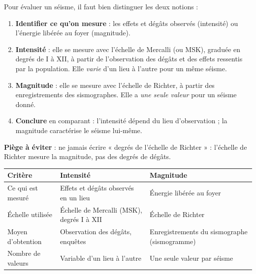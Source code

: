 \documentclass[11pt]{article}
\newcommand{\cle}[1]{{\popxbold\color{popdark}#1}}
\begin{document}
\begin{methode}
Pour évaluer un séisme, il faut bien distinguer les deux notions :
\begin{enumerate}
\item \textbf{Identifier ce qu'on mesure} : les effets et dégâts observés (intensité) ou l'énergie libérée au foyer (magnitude).
\item \textbf{Intensité} : elle se mesure avec l'\cle{échelle de Mercalli} (ou MSK), graduée en degrés de I à XII, à partir de l'observation des dégâts et des effets ressentis par la population. Elle \emph{varie} d'un lieu à l'autre pour un même séisme.
\item \textbf{Magnitude} : elle se mesure avec l'\cle{échelle de Richter}, à partir des enregistrements des sismographes. Elle a \emph{une seule valeur} pour un séisme donné.
\item \textbf{Conclure} en comparant : l'intensité dépend du lieu d'observation ; la magnitude caractérise le séisme lui-même.
\end{enumerate}
\textbf{Piège à éviter} : ne jamais écrire « degrés de l'échelle de Richter » : l'échelle de Richter mesure la magnitude, pas des degrés de dégâts.
\end{methode}

\begin{aretenir}
\begin{center}
\begin{tabularx}{\linewidth}{|l|X|X|}
\hline
\rowcolor{popblueL} \textbf{Critère} & \textbf{Intensité} & \textbf{Magnitude} \\
\hline
Ce qui est mesuré & Effets et dégâts observés en un lieu & Énergie libérée au foyer \\
\hline
Échelle utilisée & Échelle de Mercalli (MSK), degrés I à XII & Échelle de Richter \\
\hline
Moyen d'obtention & Observation des dégâts, enquêtes & Enregistrements du sismographe (sismogramme) \\
\hline
Nombre de valeurs & Variable d'un lieu à l'autre & Une seule valeur par séisme \\
\hline
\end{tabularx}
\end{center}
\end{aretenir}
\end{document}

